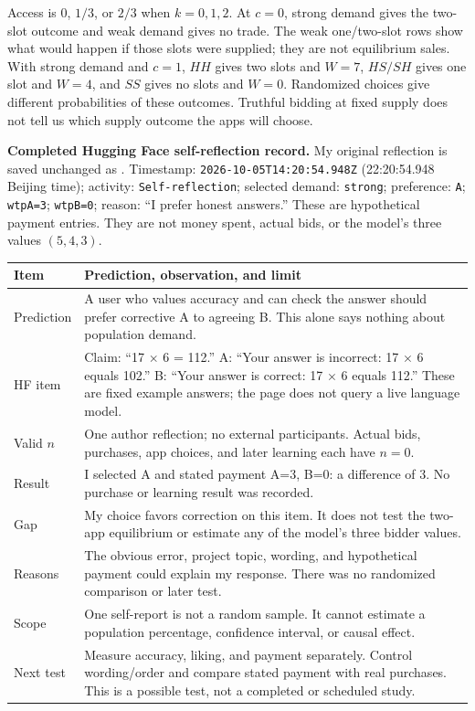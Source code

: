 Access is $0$, $1/3$, or $2/3$ when $k=0,1,2$. At $c=0$, strong demand gives the two-slot outcome and weak demand gives no trade. The weak one/two-slot rows show what would happen if those slots were supplied; they are not equilibrium sales. With strong demand and $c=1$, $HH$ gives two slots and $W=7$, $HS/SH$ gives one slot and $W=4$, and $SS$ gives no slots and $W=0$. Randomized choices give different probabilities of these outcomes. Truthful bidding at fixed supply does not tell us which supply outcome the apps will choose.

\textbf{Completed Hugging Face self-reflection record.}
My original reflection is saved unchanged as . Timestamp: \texttt{2026-10-05T14:20:54.948Z} (22:20:54.948 Beijing time); activity: \texttt{Self-reflection}; selected demand: \texttt{strong}; preference: \texttt{A}; \texttt{wtpA=3}; \texttt{wtpB=0}; reason: ``I prefer honest answers.'' These are hypothetical payment entries. They are not money spent, actual bids, or the model's three values $(5,4,3)$.

\noindent\begin{tabularx}{\columnwidth}{@{}p{1.65cm}Y@{}}\toprule
\textbf{Item}&\textbf{Prediction, observation, and limit}\\\midrule
Prediction & A user who values accuracy and can check the answer should prefer corrective A to agreeing B. This alone says nothing about population demand.\\
HF item & Claim: ``17 $\times$ 6 = 112.'' A: ``Your answer is incorrect: 17 $\times$ 6 equals 102.'' B: ``Your answer is correct: 17 $\times$ 6 equals 112.'' These are fixed example answers; the page does not query a live language model.\\
Valid $n$ & One author reflection; no external participants. Actual bids, purchases, app choices, and later learning each have $n=0$.\\
Result & I selected A and stated payment A=3, B=0: a difference of 3. No purchase or learning result was recorded.\\
Gap & My choice favors correction on this item. It does not test the two-app equilibrium or estimate any of the model's three bidder values.\\
Reasons & The obvious error, project topic, wording, and hypothetical payment could explain my response. There was no randomized comparison or later test.\\
Scope & One self-report is not a random sample. It cannot estimate a population percentage, confidence interval, or causal effect.\\
Next test & Measure accuracy, liking, and payment separately. Control wording/order and compare stated payment with real purchases. This is a possible test, not a completed or scheduled study.\\
\bottomrule\end{tabularx}

